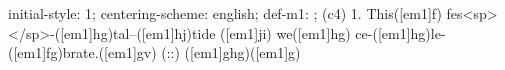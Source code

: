 initial-style: 1;
centering-scheme: english;
def-m1: \grealign;
(c4) 1. This([em1]f) fes<sp> </sp>-([em1]hg)tal--([em1]hj)tide ([em1]ji) we([em1]hg) ce-([em1]hg)le-([em1]fg)brate.([em1]gv) (::) ([em1]ghg)([em1]g)